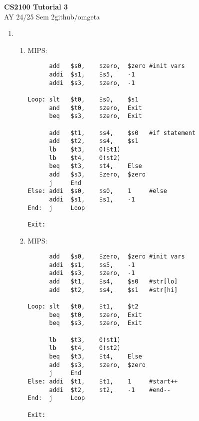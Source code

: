 \documentclass[12pt, a4paper]{article}
\newcommand{\mytitle}{CS2100 Tutorial 3}
\newcommand{\myauthor}{github/omgeta}
\newcommand{\mydate}{AY 24/25 Sem 2}
\begin{document}
\raggedright
\footnotesize
\begin{center}
{\normalsize{\textbf{\mytitle}}} \\
{\footnotesize{\mydate\hspace{2pt}\textemdash\hspace{2pt}\myauthor}}
\end{center}
\begin{enumerate}[Q\arabic*.]
  \item 
    \begin{enumerate}[(\alph*.)]
      \item MIPS: 
        \begin{lstlisting}
      add   $s0,    $zero,  $zero #init vars
      addi  $s1,    $s5,    -1  
      addi  $s3,    $zero,  -1

Loop: slt   $t0,    $s0,    $s1
      and   $t0,    $zero,  Exit
      beq   $s3,    $zero,  Exit

      add   $t1,    $s4,    $s0   #if statement 
      add   $t2,    $s4,    $s1
      lb    $t3,    0($t1)
      lb    $t4,    0($t2)
      beq   $t3,    $t4,    Else
      add   $s3,    $zero,  $zero 
      j     End
Else: addi  $s0,    $s0,    1     #else
      addi  $s1,    $s1,    -1
End:  j     Loop

Exit: 
        \end{lstlisting}

      \item MIPS: 
        \begin{lstlisting}
      add   $s0,    $zero,  $zero #init vars
      addi  $s1,    $s5,    -1  
      addi  $s3,    $zero,  -1
      add   $t1,    $s4,    $s0   #str[lo]  
      add   $t2,    $s4,    $s1   #str[hi]  

Loop: slt   $t0,    $t1,    $t2
      beq   $t0,    $zero,  Exit
      beq   $s3,    $zero,  Exit

      lb    $t3,    0($t1)
      lb    $t4,    0($t2)
      beq   $t3,    $t4,    Else
      add   $s3,    $zero,  $zero 
      j     End
Else: addi  $t1,    $t1,    1     #start++
      addi  $t2,    $t2,    -1    #end--
End:  j     Loop

Exit: 
        \end{lstlisting}
    \end{enumerate}
    \pagebreak


\end{enumerate}
\end{document}
